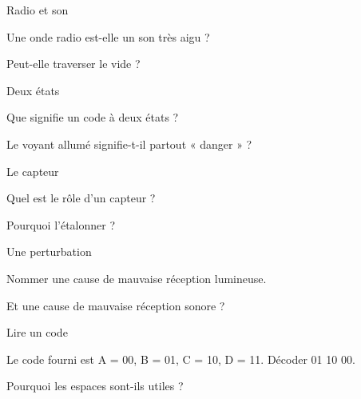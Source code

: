 \par\noindent\begin{minipage}{\linewidth}
\begin{exercice}[1]{Radio et son}
\begin{questions}
\item Une onde radio est-elle un son très aigu ?
\item Peut-elle traverser le vide ?
\end{questions}
\end{exercice}
\end{minipage}
\par\noindent\begin{minipage}{\linewidth}
\begin{exercice}[1]{Deux états}
\begin{questions}
\item Que signifie un code à deux états ?
\item Le voyant allumé signifie-t-il partout « danger » ?
\end{questions}
\end{exercice}
\end{minipage}
\par\noindent\begin{minipage}{\linewidth}
\begin{exercice}[1]{Le capteur}
\begin{questions}
\item Quel est le rôle d’un capteur ?
\item Pourquoi l’étalonner ?
\end{questions}
\end{exercice}
\end{minipage}
\par\noindent\begin{minipage}{\linewidth}
\begin{exercice}[1]{Une perturbation}
\begin{questions}
\item Nommer une cause de mauvaise réception lumineuse.
\item Et une cause de mauvaise réception sonore ?
\end{questions}
\end{exercice}
\end{minipage}
\clearpage{}
\par\noindent\begin{minipage}{\linewidth}
\begin{exercice}[2]{Lire un code}
\begin{questions}
\item Le code fourni est A = 00, B = 01, C = 10, D = 11. Décoder 01 10 00.
\item Pourquoi les espaces sont-ils utiles ?
\end{questions}
\end{exercice}
\end{minipage}
